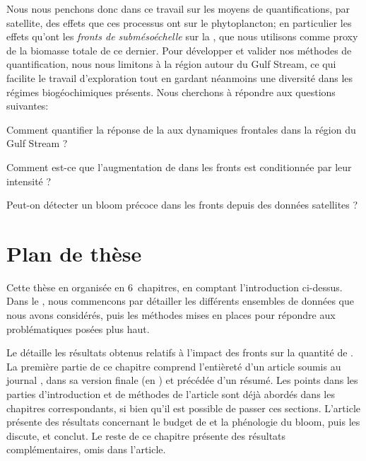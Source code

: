 Nous nous penchons donc dans ce travail sur les moyens de quantifications, par satellite, des effets que ces processus ont sur le phytoplancton; en particulier les effets qu'ont les \emph{fronts de submésoéchelle} sur la \emph{}, que nous utilisons comme proxy de la biomasse totale de ce dernier.
Pour développer et valider nos méthodes de quantification, nous nous limitons à la région autour du Gulf Stream, ce qui facilite le travail d'exploration tout en gardant néanmoins une diversité dans les régimes biogéochimiques présents.
Nous cherchons à répondre aux questions suivantes:

\begin{tcolorbox}[
  enhanced,
  frame hidden, interior hidden,
  borderline={1.pt}{3pt}{black}, arc=2.mm,
  borderline north={1.2pt}{0pt}{black},
  borderline south={1.2pt}{0pt}{black},
  borderline west={1.2pt}{0pt}{black},
  borderline east={1.2pt}{0pt}{black},
  top=2\onelineskip,
  bottom=2\onelineskip,
  left=1.em, right=0.9em,
  ]
  \begin{list}{}{
      \setlength{\labelsep}{0.5em}
      \setlength{\itemindent}{0pt}
      \setlength{\leftmargin}{1em}
      \setlength{\labelwidth}{0.5em}
      \setlength{\listparindent}{0pt}
      \setlength{\parsep}{\parskip}
      \setlength{\itemsep}{\onelineskip}
      \setlength{\topsep}{\onelineskip}
      \renewcommand*\makelabel[1]{\adfrightarrowhead}}
    \item Comment quantifier la réponse de la  aux dynamiques frontales dans la région du Gulf Stream ?
    \item Comment est-ce que l'augmentation de  dans les fronts est conditionnée par leur intensité ?
    \item Peut-on détecter un bloom précoce dans les fronts depuis des données satellites ?
  \end{list}
\end{tcolorbox}

\section{Plan de thèse}
\label{sec:plan-de-these}

Cette thèse en organisée en 6~chapitres, en comptant l'introduction ci-dessus.
Dans le , nous commencons par détailler les différents ensembles de données que nous avons considérés, puis les méthodes mises en places pour répondre aux problématiques posées plus haut.

Le  détaille les résultats obtenus relatifs à l'impact des fronts sur la quantité de .
La première partie de ce chapitre comprend l'entièreté d'un article soumis au journal , dans sa version finale (en ) et précédée d'un résumé.
Les points dans les parties d'introduction et de méthodes de l'article sont déjà abordés dans les chapitres correspondants, si bien qu'il est possible de passer ces sections.
L'article présente des résultats concernant le budget de  et la phénologie du bloom, puis les discute, et conclut.
Le reste de ce chapitre présente des résultats complémentaires, omis dans l'article.

